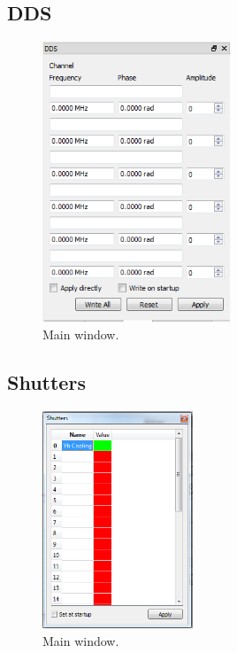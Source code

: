 \documentclass[11pt]{scrartcl}
\begin{document}
\subsection{DDS}
\begin{figure}[htbp]
\begin{center}
\includegraphics[width=0.5\textwidth]{DDS}
\end{center}
\caption{\label{DDS} Main window.}
\end{figure}

\subsection{Shutters}
\begin{figure}[htbp]
\begin{center}
\includegraphics[width=0.4\textwidth]{Shutters}
\end{center}
\caption{\label{Shutters} Main window.}
\end{figure}
\end{document}
